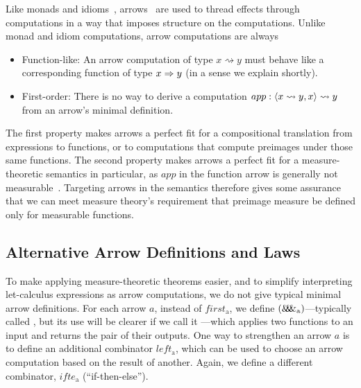\documentclass{llncs}
\newcommand{\arrow}{\rightsquigarrow}
\newcommand{\arrowpair}{\ensuremath{\mathit{\&\mspace{-7.5mu}\&\mspace{-7.5mu}\&}}}
\newcommand{\arrowif}{\ensuremath{ifte}}
\newcommand{\gen}{_\mathrm{a}}
\begin{document}
Like monads and idioms~\cite{cit:wadler-2001-monads,cit:mcbride-2008jfp-idiom}, arrows~\cite{cit:hughes-2000scp-arrows} are used to thread effects through computations in a way that imposes structure on the computations.
Unlike monad and idiom computations, arrow computations are always
\begin{itemize}
	\item Function-like: An arrow computation of type $x \arrow y$ must behave like a corresponding function of type $x \Rightarrow y$ (in a sense we explain shortly).
	\item First-order: There is no way to derive a computation $app : \pair{x \arrow y, x} \arrow y$ from an arrow's minimal definition.
\end{itemize}
The first property makes arrows a perfect fit for a compositional translation from expressions to functions, or to computations that compute preimages under those same functions.
The second property makes arrows a perfect fit for a measure-theoretic semantics in particular, as $app$ in the function arrow is generally not measurable~\cite{cit:aumann-1961ijm-borel}.
Targeting arrows in the semantics therefore gives some assurance that we can meet measure theory's requirement that preimage measure be defined only for measurable functions.

\subsection{Alternative Arrow Definitions and Laws}
\label{sec:arrow-definitions}

To make applying measure-theoretic theorems easier, and to simplify interpreting let-calculus expressions as arrow computations, we do not give typical minimal arrow definitions.
For each arrow $a$, instead of $first\gen$, we define $(\arrowpair\gen)$---typically called , but its use will be clearer if we call it ---which applies two functions to an input and returns the pair of their outputs.
One way to strengthen an arrow $a$ is to define an additional combinator $left\gen$, which can be used to choose an arrow computation based on the result of another.
Again, we define a different combinator, $\arrowif\gen$ (``if-then-else'').
\end{document}

